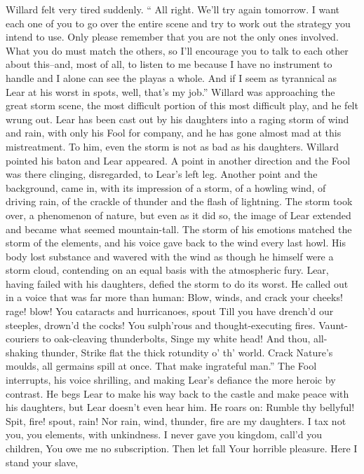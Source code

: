 \documentclass[a4paper,12pt]{article}
\begin{document}
Willard felt very tired suddenly. “ All right. We’ll try again tomorrow. I want each one of you to
go over the entire scene and try to work out the strategy you intend to use. Only please remember that you
are not the only ones involved. What you do must match the others, so I’ll encourage you to talk to each
other about this--and, most of all, to listen to me because I have no instrument to handle and I alone can see
the playas a whole. And if I seem as tyrannical as Lear at his worst in spots, well, that’s my job.”
Willard was approaching the great storm scene, the most difficult portion of this most difficult
play, and he felt wrung out. Lear has been cast out by his daughters into a raging storm of wind and rain,
with only his Fool for company, and he has gone almost mad at this mistreatment. To him, even the storm
is not as bad as his daughters.
Willard pointed his baton and Lear appeared. A point in another direction and the Fool was there
clinging, disregarded, to Lear’s left leg. Another point and the background, came in, with its impression of
a storm, of a howling wind, of driving rain, of the crackle of thunder and the flash of lightning.
The storm took over, a phenomenon of nature, but even as it did so, the image of Lear extended
and became what seemed mountain-tall. The storm of his emotions matched the storm of the elements, and
his voice gave back to the wind every last howl. His body lost substance and wavered with the wind as
though he himself were a storm cloud, contending on an equal basis with the atmospheric fury. Lear,
having failed with his daughters, defied the storm to do its worst. He called out in a voice that was far more
than human:
Blow, winds, and crack your cheeks! rage! blow!
You cataracts and hurricanoes, spout
Till you have drench’d our steeples, drown’d the cocks!
You sulph’rous and thought-executing fires.
Vaunt-couriers to oak-cleaving thunderbolts,
Singe my white head! And thou, all-shaking thunder,
Strike flat the thick rotundity o’ th’ world.
Crack Nature’s moulds, all germains spill at once.
That make ingrateful man.”
The Fool interrupts, his voice shrilling, and making Lear’s defiance the more heroic by contrast.
He begs Lear to make his way back to the castle and make peace with his daughters, but Lear doesn’t even
hear him. He roars on:
Rumble thy bellyful! Spit, fire! spout, rain!
Nor rain, wind, thunder, fire are my daughters.
I tax not you, you elements, with unkindness.
I never gave you kingdom, call’d you children,
You owe me no subscription. Then let fall
Your horrible pleasure. Here I stand your slave,
\end{document}
